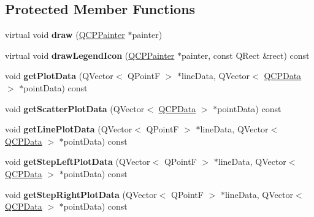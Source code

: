 \subsection*{Protected Member Functions}
\begin{DoxyCompactItemize}
\item 
\hypertarget{classQCPGraph_a659218cc62c2a7786213d9dd429c1c8d}{virtual void {\bfseries draw} (\hyperlink{classQCPPainter}{Q\-C\-P\-Painter} $\ast$painter)}\label{classQCPGraph_a659218cc62c2a7786213d9dd429c1c8d}

\item 
\hypertarget{classQCPGraph_a9a1a3d937a35368c421657860aa5a173}{virtual void {\bfseries draw\-Legend\-Icon} (\hyperlink{classQCPPainter}{Q\-C\-P\-Painter} $\ast$painter, const Q\-Rect \&rect) const }\label{classQCPGraph_a9a1a3d937a35368c421657860aa5a173}

\item 
\hypertarget{classQCPGraph_af66183533a29520be3e74489ad1449cc}{void {\bfseries get\-Plot\-Data} (Q\-Vector$<$ Q\-Point\-F $>$ $\ast$line\-Data, Q\-Vector$<$ \hyperlink{classQCPData}{Q\-C\-P\-Data} $>$ $\ast$point\-Data) const }\label{classQCPGraph_af66183533a29520be3e74489ad1449cc}

\item 
\hypertarget{classQCPGraph_a0899c4d6357aee19a3abff5897c3c8c5}{void {\bfseries get\-Scatter\-Plot\-Data} (Q\-Vector$<$ \hyperlink{classQCPData}{Q\-C\-P\-Data} $>$ $\ast$point\-Data) const }\label{classQCPGraph_a0899c4d6357aee19a3abff5897c3c8c5}

\item 
\hypertarget{classQCPGraph_ac76804eb33446181f3e4f708b7639a75}{void {\bfseries get\-Line\-Plot\-Data} (Q\-Vector$<$ Q\-Point\-F $>$ $\ast$line\-Data, Q\-Vector$<$ \hyperlink{classQCPData}{Q\-C\-P\-Data} $>$ $\ast$point\-Data) const }\label{classQCPGraph_ac76804eb33446181f3e4f708b7639a75}

\item 
\hypertarget{classQCPGraph_a6b7c14e04deed69b70d552dbe70c4d28}{void {\bfseries get\-Step\-Left\-Plot\-Data} (Q\-Vector$<$ Q\-Point\-F $>$ $\ast$line\-Data, Q\-Vector$<$ \hyperlink{classQCPData}{Q\-C\-P\-Data} $>$ $\ast$point\-Data) const }\label{classQCPGraph_a6b7c14e04deed69b70d552dbe70c4d28}

\item 
\hypertarget{classQCPGraph_ab2ad46716889c73ab977cf9280de0788}{void {\bfseries get\-Step\-Right\-Plot\-Data} (Q\-Vector$<$ Q\-Point\-F $>$ $\ast$line\-Data, Q\-Vector$<$ \hyperlink{classQCPData}{Q\-C\-P\-Data} $>$ $\ast$point\-Data) const }\label{classQCPGraph_ab2ad46716889c73ab977cf9280de0788}


\end{DoxyCompactItemize}
